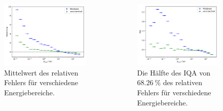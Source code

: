 \documentclass[aspectratio=1610, professionalfonts, 9pt]{beamer}
\begin{document}
  \begin{frame}
    \begin{columns}
      \begin{figure}
        \includegraphics[width=\textwidth]{pictures/RF_nested_bias.pdf}
        \caption{Mittelwert des relativen Fehlers für verschiedene Energiebereiche.}
        \label{}
      \end{figure}
      \begin{figure}
        \includegraphics[width=\textwidth]{pictures/RF_nested_resolution.pdf}
        \caption{Die Hälfte des IQA von $\SI{68,26}{\percent}$ des relativen Fehlers für verschiedene Energiebereiche.}
        \label{}
      \end{figure}
    \end{columns}
  \end{frame}
\end{document}
